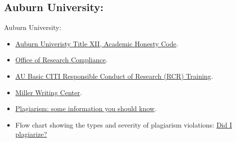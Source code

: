 \documentclass[11pt]{beamer}
\begin{document}
\subsection{Auburn University:}
\begin{frame}{Auburn University:}
	\begin{itemize}
	\item {\color{blue}\href{	https://sites.auburn.edu/admin/universitypolicies/Policies/AcademicHonestyCode.pdf}{Auburn Univeristy Title XII, Academic Honesty Code}}.
	\vspace{0.2 cm}
	\item {\color{blue}\href{https://cws.auburn.edu/OVPR/pm/compliance/home}{Office of Research Compliance}}.
	\vspace{0.2 cm}
	\item {\color{blue}\href{https://cws.auburn.edu/OVPR/pm/compliance/rcr/home}{AU Basic CITI Responsible Conduct of Research (RCR) Training}}.
	\vspace{0.2 cm}
	\item {\color{blue}\href{https://auburn.edu/academic/provost/university-writing/miller-writing-center/}{Miller Writing Center}}.
	\vspace{0.2 cm}
	\item {\color{blue}\href{https://libguides.auburn.edu/plagiarismseminar}{Plagiarism: some information you should know}}.
	\vspace{0.2 cm}
	\item Flow chart showing the types and severity of plagiarism violations: {\color{blue}\href{https://thevisualcommunicationguy.com/wp-content/uploads/2014/09/Infographic_Did-I-Plagiarize1.jpg}{Did I plagiarize?}}
	\end{itemize}
\end{frame}

\end{document}
